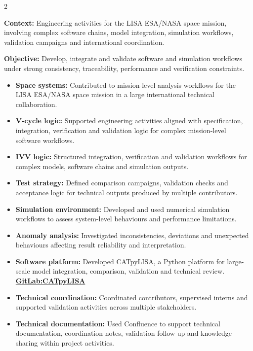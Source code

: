 \documentclass[8pt,a4paper,ragged2e,withhyper]{altacv}
\begin{document}
\begin{paracol}{2}
\divider


\textbf{Context:} Engineering activities for the LISA ESA/NASA space mission, involving complex software chains, model integration, simulation workflows, validation campaigns and international coordination.

\textbf{Objective:} Develop, integrate and validate software and simulation workflows under strong consistency, traceability, performance and verification constraints.

\begin{itemize}
  \item \textbf{Space systems:} Contributed to mission-level analysis workflows for the LISA ESA/NASA space mission in a large international technical collaboration.
  \item \textbf{V-cycle logic:} Supported engineering activities aligned with specification, integration, verification and validation logic for complex mission-level software workflows.
  \item \textbf{IVV logic:} Structured integration, verification and validation workflows for complex models, software chains and simulation outputs.
  \item \textbf{Test strategy:} Defined comparison campaigns, validation checks and acceptance logic for technical outputs produced by multiple contributors.
  \item \textbf{Simulation environment:} Developed and used numerical simulation workflows to assess system-level behaviours and performance limitations.
  \item \textbf{Anomaly analysis:} Investigated inconsistencies, deviations and unexpected behaviours affecting result reliability and interpretation.
  \item \textbf{Software platform:} Developed CATpyLISA, a Python platform for large-scale model integration, comparison, validation and technical review.
  \textcolor{DarkPastelRed}{\href{https://gitlab.oca.eu/gboileau/lisa_l3_tools}{\bf GitLab:CATpyLISA}}
  \item \textbf{Technical coordination:} Coordinated contributors, supervised interns and supported validation activities across multiple stakeholders.
  \item \textbf{Technical documentation:} Used Confluence to support technical documentation, coordination notes, validation follow-up and knowledge sharing within project activities.
\end{itemize}


\end{paracol}
\end{document}
